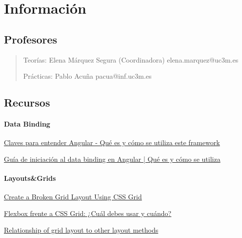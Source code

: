 \documentclass[12pt, twoside, openright]{report} %
\begin{document}
\listoffigures
\thispagestyle{fancy}





\chapter{Información}
\section{Profesores}
\begin{quote}
Teorías: Elena Márquez Segura (Coordinadora) elena.marquez@uc3m.es

Prácticas: Pablo Acuña pacua@inf.uc3m.es
\end{quote}

\section{Recursos}

\subsubsection{Data Binding}
\href{https://www.acontracorrientech.com/claves-para-entender-angular-que-es-y-como-se-utiliza/}{Claves para entender Angular - Qué es y cómo se utiliza este framework}

\href{https://www.acontracorrientech.com/guia-practica-del-databinding-en-angular/}{Guía de iniciación al data binding en Angular | Qué es y cómo se utiliza}

\subsubsection{Layouts\&Grids}
\href{https://webdesign.tutsplus.com/tutorials/create-a-broken-grid-layout-using-css-grid--cms-30870}{Create a Broken Grid Layout Using CSS Grid}

\href{https://webdesign.tutsplus.com/es/articles/flexbox-vs-css-grid-which-should-you-use--cms-30184}{Flexbox frente a CSS Grid: ¿Cuál debes usar y cuándo?}

\href{https://developer.mozilla.org/en-US/docs/Web/CSS/CSS_Grid_Layout/Relationship_of_Grid_Layout#grid_and_flexbox}{Relationship of grid layout to other layout methods}
\end{document}
